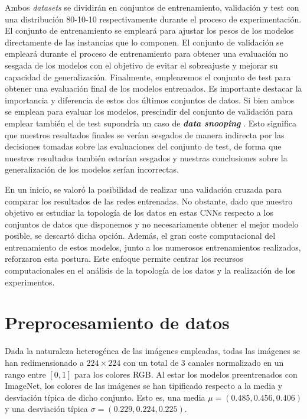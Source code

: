 Ambos \textit{datasets} se dividirán en conjuntos de entrenamiento, validación y
test con una distribución 80-10-10 respectivamente durante el proceso de experimentación.
El conjunto de entrenamiento se empleará para ajustar los pesos de los modelos
directamente de las instancias que lo componen. El conjunto de validación se empleará
durante el proceso de entrenamiento para obtener una evaluación no sesgada de los
modelos con el objetivo de evitar el sobreajuste y mejorar su capacidad de generalización.
Finalmente, emplearemos el conjunto de test para obtener una evaluación final de
los modelos entrenados. Es importante destacar la importancia y diferencia de
estos dos últimos conjuntos de datos. Si bien ambos se emplean para evaluar los modelos,
prescindir del conjunto de validación para emplear también el de test supondría
un caso de \textbf{\textit{data snooping}} \cite{white2000reality}. Esto
significa que nuestros resultados finales se verían sesgados de manera indirecta
por las decisiones tomadas sobre las evaluaciones del conjunto de test, de forma
que nuestros resultados también estarían sesgados y nuestras conclusiones sobre la
generalización de los modelos serían incorrectas.

En un inicio, se valoró la posibilidad de realizar una validación cruzada para
comparar los resultados de las redes entrenadas. No obstante, dado que nuestro
objetivo es estudiar la topología de los datos en estas CNNs respecto a los
conjuntos de datos que disponemos y no necesariamente obtener el mejor modelo
posible, se descartó dicha opción. Además, el gran coste computacional del entrenamiento
de estos modelos, junto a los numerosos entrenamientos realizados, reforzaron esta
postura. Este enfoque permite centrar los recursos computacionales en el
análisis de la topología de los datos y la realización de los experimentos.

\section{Preprocesamiento de datos}
\label{sec:data-aug}

Dada la naturaleza heterogénea de las imágenes empleadas, todas las imágenes se
han redimensionado a $224 \times 224$ con un total de $3$ canales normalizado en
un rango entre $[0,1]$ para los colores RGB. Al estar los modelos preentrenados con
ImageNet, los colores de las imágenes se han tipificado respecto a la media y
desviación típica de dicho conjunto. Esto es, una media
$\mu = (0.485, 0.456, 0.406)$ y una desviación típica
$\sigma = (0.229, 0.224, 0.225)$.

